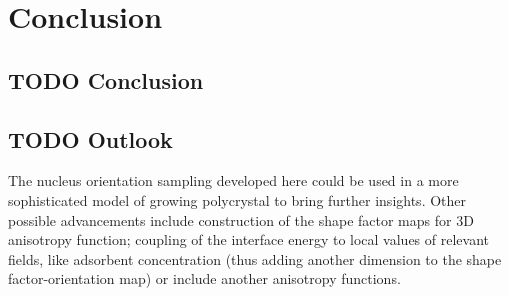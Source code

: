 \chapter{Conclusion}
\section{TODO Conclusion}
	
\section{TODO Outlook}
The nucleus orientation sampling developed here could be used in a more sophisticated model of growing polycrystal to bring further insights. Other possible advancements include construction of the shape factor maps for 3D anisotropy function; coupling of the interface energy to local values of relevant fields, like adsorbent concentration (thus adding another dimension to the shape factor-orientation map) or include another anisotropy functions.
\cleardoublepage

